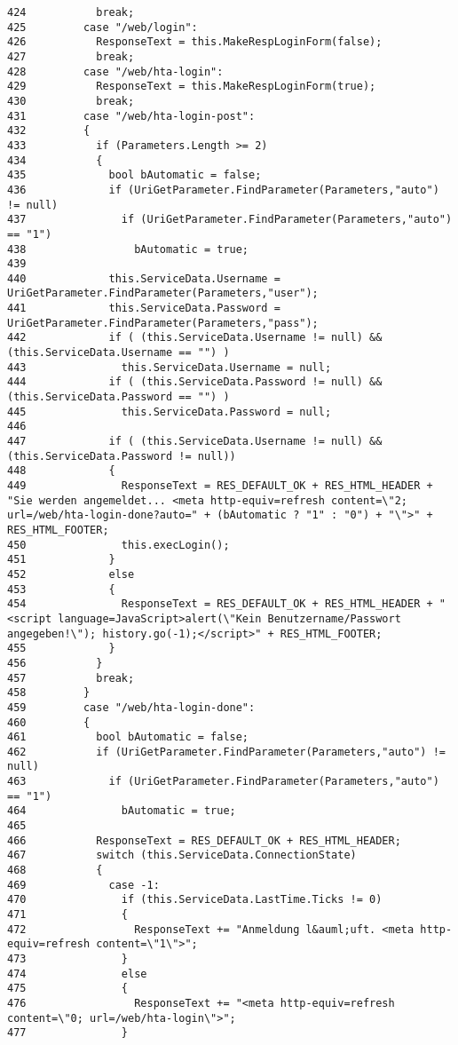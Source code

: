 \begin{verbatim}
424           break;
425         case "/web/login":
426           ResponseText = this.MakeRespLoginForm(false);
427           break;
428         case "/web/hta-login":
429           ResponseText = this.MakeRespLoginForm(true);
430           break;
431         case "/web/hta-login-post":
432         {
433           if (Parameters.Length >= 2)
434           { 
435             bool bAutomatic = false;
436             if (UriGetParameter.FindParameter(Parameters,"auto") != null) 
437               if (UriGetParameter.FindParameter(Parameters,"auto") == "1")
438                 bAutomatic = true;
439 
440             this.ServiceData.Username = UriGetParameter.FindParameter(Parameters,"user");
441             this.ServiceData.Password = UriGetParameter.FindParameter(Parameters,"pass");
442             if ( (this.ServiceData.Username != null) && (this.ServiceData.Username == "") )
443               this.ServiceData.Username = null;
444             if ( (this.ServiceData.Password != null) && (this.ServiceData.Password == "") )
445               this.ServiceData.Password = null;
446       
447             if ( (this.ServiceData.Username != null) && (this.ServiceData.Password != null))
448             {
449               ResponseText = RES_DEFAULT_OK + RES_HTML_HEADER + "Sie werden angemeldet... <meta http-equiv=refresh content=\"2; url=/web/hta-login-done?auto=" + (bAutomatic ? "1" : "0") + "\">" + RES_HTML_FOOTER;
450               this.execLogin();
451             }
452             else 
453             {
454               ResponseText = RES_DEFAULT_OK + RES_HTML_HEADER + "<script language=JavaScript>alert(\"Kein Benutzername/Passwort angegeben!\"); history.go(-1);</script>" + RES_HTML_FOOTER;
455             }
456           }
457           break;
458         }
459         case "/web/hta-login-done":
460         {
461           bool bAutomatic = false;
462           if (UriGetParameter.FindParameter(Parameters,"auto") != null) 
463             if (UriGetParameter.FindParameter(Parameters,"auto") == "1")
464               bAutomatic = true;
465 
466           ResponseText = RES_DEFAULT_OK + RES_HTML_HEADER;
467           switch (this.ServiceData.ConnectionState)
468           {
469             case -1:
470               if (this.ServiceData.LastTime.Ticks != 0)
471               {
472                 ResponseText += "Anmeldung l&auml;uft. <meta http-equiv=refresh content=\"1\">";
473               } 
474               else 
475               {
476                 ResponseText += "<meta http-equiv=refresh content=\"0; url=/web/hta-login\">";
477               }

\end{verbatim}

